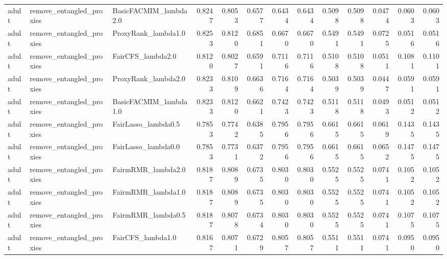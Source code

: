 \begin{tabular}{lllrrrrrrrrrr}
adult & remove_entangled_proxies & BasicFACMIM_lambda2.0 & 0.8247 & 0.8053 & 0.6577 & 0.6434 & 0.6434 & 0.5098 & 0.5098 & 0.0474 & 0.0603 & 0.0603 \\
adult & remove_entangled_proxies & ProxyRank_lambda1.0 & 0.8253 & 0.8120 & 0.6851 & 0.6670 & 0.6670 & 0.5491 & 0.5491 & 0.0725 & 0.0516 & 0.0516 \\
adult & remove_entangled_proxies & FairCFS_lambda2.0 & 0.8120 & 0.8027 & 0.6591 & 0.7116 & 0.7116 & 0.5108 & 0.5108 & 0.0511 & 0.1081 & 0.1101 \\
adult & remove_entangled_proxies & ProxyRank_lambda2.0 & 0.8233 & 0.8109 & 0.6636 & 0.7164 & 0.7164 & 0.5039 & 0.5039 & 0.0447 & 0.0591 & 0.0591 \\
adult & remove_entangled_proxies & BasicFACMIM_lambda1.0 & 0.8233 & 0.8120 & 0.6621 & 0.7423 & 0.7423 & 0.5118 & 0.5118 & 0.0493 & 0.0512 & 0.0512 \\
adult & remove_entangled_proxies & FairLasso_lambda0.5 & 0.7853 & 0.7742 & 0.6385 & 0.7956 & 0.7956 & 0.6615 & 0.6615 & 0.0619 & 0.1435 & 0.1435 \\
adult & remove_entangled_proxies & FairLasso_lambda0.0 & 0.7853 & 0.7731 & 0.6372 & 0.7956 & 0.7956 & 0.6615 & 0.6615 & 0.0652 & 0.1475 & 0.1475 \\
adult & remove_entangled_proxies & FairmRMR_lambda2.0 & 0.8187 & 0.8089 & 0.6735 & 0.8030 & 0.8030 & 0.5525 & 0.5525 & 0.0741 & 0.1052 & 0.1052 \\
adult & remove_entangled_proxies & FairmRMR_lambda1.0 & 0.8187 & 0.8089 & 0.6735 & 0.8030 & 0.8030 & 0.5525 & 0.5525 & 0.0741 & 0.1052 & 0.1052 \\
adult & remove_entangled_proxies & FairmRMR_lambda0.5 & 0.8187 & 0.8078 & 0.6734 & 0.8030 & 0.8030 & 0.5525 & 0.5525 & 0.0741 & 0.1075 & 0.1075 \\
adult & remove_entangled_proxies & FairCFS_lambda1.0 & 0.8167 & 0.8071 & 0.6729 & 0.8057 & 0.8057 & 0.5511 & 0.5511 & 0.0741 & 0.0950 & 0.0950 \\
\bottomrule
\end{tabular}
